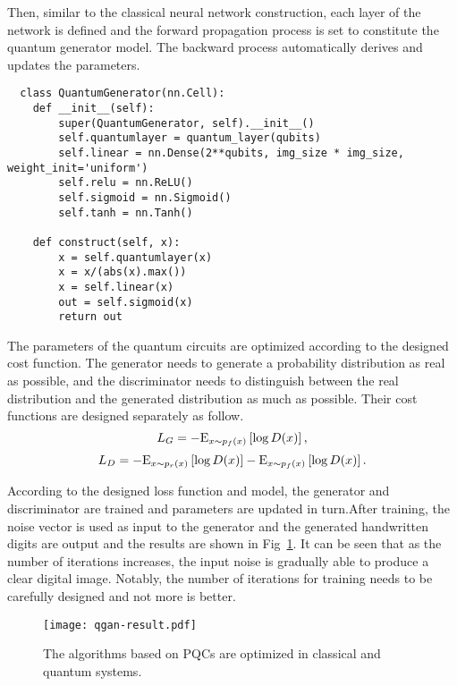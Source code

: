 Then, similar to the classical neural network construction, each layer of the network is defined and the forward propagation process is set to constitute the quantum generator model. The backward process automatically derives and updates the parameters.
\begin{lstlisting}
  class QuantumGenerator(nn.Cell):
    def __init__(self):
        super(QuantumGenerator, self).__init__()
        self.quantumlayer = quantum_layer(qubits)
        self.linear = nn.Dense(2**qubits, img_size * img_size, weight_init='uniform')
        self.relu = nn.ReLU()
        self.sigmoid = nn.Sigmoid()
        self.tanh = nn.Tanh()

    def construct(self, x):
        x = self.quantumlayer(x)
        x = x/(abs(x).max())
        x = self.linear(x)
        out = self.sigmoid(x)
        return out
\end{lstlisting}

The parameters of the quantum circuits are optimized according to the designed cost function. The generator needs to generate a probability distribution as real as possible, and the discriminator needs to distinguish between the real distribution and the generated distribution as much as possible. Their cost functions are designed separately as follow.
\begin{equation}
  {L_G} =  - {{\rm E}_{x\sim{p_f}(x)}}\left[ {\log D(x)} \right],
  \end{equation}
\begin{equation}
  {L_D} =  - {{\rm E}_{x\sim{p_r}(x)}}\left[ {\log D(x)} \right] - {{\rm E}_{x\sim{p_f}(x)}}\left[ {\log D(x)} \right].
  \end{equation}

According to the designed loss function and model, the generator and discriminator are trained and parameters are updated in turn.After training, the noise vector is used as input to the generator and the generated handwritten digits are output and the results are shown in Fig~\ref{qgan-result}. It can be seen that as the number of iterations increases, the input noise is gradually able to produce a clear digital image. Notably, the number of iterations for training needs to be carefully designed and not more is better.
\begin{figure}[htbp]
	\centering
	\texttt{[image: qgan-result.pdf]}
	\caption{\label{qgan-result} The algorithms based on PQCs are optimized in classical and quantum systems.}
  \end{figure}